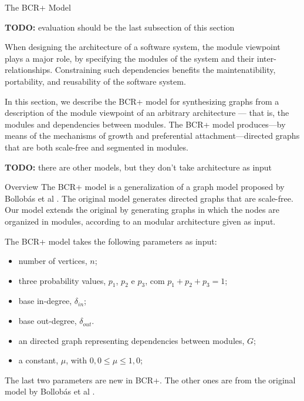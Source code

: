 \documentclass[11pt,twocolumn,a4paper,english]{article}
\newcommand{\TODO}{\textbf{TODO:} }
\begin{document}
\begin{section}{The BCR+ Model}	
	\newcommand{\din}[0]{\ensuremath{\delta_{in}}}
	\newcommand{\dout}[0]{\ensuremath{\delta_{out}}}
	\newcommand{\gin}[0]{\ensuremath{\mathrm{g}_{in}}}
	\newcommand{\gout}[0]{\ensuremath{\mathrm{g}_{out}}}
	
	\TODO evaluation should be the last subsection of this section
	
	When designing the architecture of a software system, the module viewpoint plays a major role, by specifying the modules of the system and their inter-relationships. Constraining such dependencies benefits the maintenatibility, portability, and reusability of the software system.
	
	In this section, we describe the BCR+ model for synthesizing graphs from a description of the module viewpoint of an arbitrary architecture --- that is, the modules and dependencies between modules. The BCR+ model produces---by means of the mechanisms of growth and preferential attachment---directed graphs that are both scale-free and segmented in modules.
	
	\TODO there are other models, but they don't take architecture as input	
	
\begin{subsection}{Overview}
	The BCR+ model is a generalization of a graph model proposed by Bollobás et al \cite{Bollobas2003}. The original model generates directed graphs that are scale-free. Our model extends the original by generating graphs in which the nodes are organized in modules, according to an modular architecture given as input.
	
	The BCR+ model takes the following parameters as input:
	
	\begin{itemize}
  \item number of vertices, $n$;
  \item three probability values, $p_1$, $p_2$ e $p_3$, com $p_1 + p_2 + p_3 = 1$;
  \item base in-degree, $\din$;
  \item base out-degree, $\dout$.
  \item an directed graph representing dependencies between modules, $G$;
  \item a constant, $\mu$, with $0,0 \le \mu \le 1,0$;
  \end{itemize}
  
	The last two parameters are new in BCR+. The other ones are from the original model by Bollobás et al \cite{Bollobas2003}.
	

\end{subsection}
\end{section}
\end{document}
